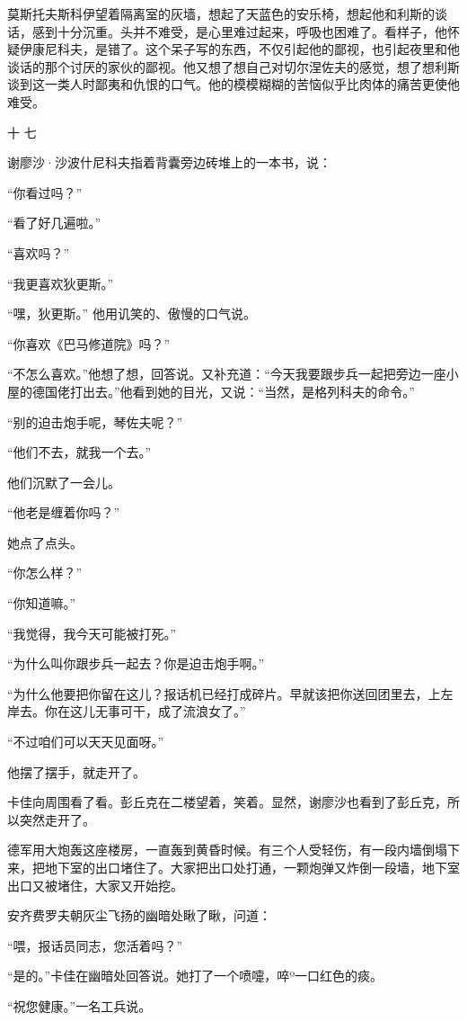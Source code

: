 莫斯托夫斯科伊望着隔离室的灰墙，想起了天蓝色的安乐椅，想起他和利斯的谈话，感到十分沉重。头并不难受，是心里难过起来，呼吸也困难了。看样子，他怀疑伊康尼科夫，是错了。这个呆子写的东西，不仅引起他的鄙视，也引起夜里和他谈话的那个讨厌的家伙的鄙视。他又想了想自己对切尔涅佐夫的感觉，想了想利斯谈到这一类人时鄙夷和仇恨的口气。他的模模糊糊的苦恼似乎比肉体的痛苦更使他难受。

十 七

谢廖沙·沙波什尼科夫指着背囊旁边砖堆上的一本书，说：

“你看过吗？”

“看了好几遍啦。”

“喜欢吗？”

“我更喜欢狄更斯。”

“嘿，狄更斯。” 他用讥笑的、傲慢的口气说。

“你喜欢《巴马修道院》吗？”

“不怎么喜欢。”他想了想，回答说。又补充道：“今天我要跟步兵一起把旁边一座小屋的德国佬打出去。”他看到她的目光，又说：“当然，是格列科夫的命令。”

“别的迫击炮手呢，琴佐夫呢？”

“他们不去，就我一个去。”

他们沉默了一会儿。

“他老是缠着你吗？”

她点了点头。

“你怎么样？”

“你知道嘛。”

“我觉得，我今天可能被打死。”

“为什么叫你跟步兵一起去？你是迫击炮手啊。”

“为什么他要把你留在这儿？报话机已经打成碎片。早就该把你送回团里去，上左岸去。你在这儿无事可干，成了流浪女了。”

“不过咱们可以天天见面呀。”

他摆了摆手，就走开了。

卡佳向周围看了看。彭丘克在二楼望着，笑着。显然，谢廖沙也看到了彭丘克，所以突然走开了。

德军用大炮轰这座楼房，一直轰到黄昏时候。有三个人受轻伤，有一段内墙倒塌下来，把地下室的出口堵住了。大家把出口处打通，一颗炮弹又炸倒一段墙，地下室出口又被堵住，大家又开始挖。

安齐费罗夫朝灰尘飞扬的幽暗处瞅了瞅，问道：

“喂，报话员同志，您活着吗？”

“是的。”卡佳在幽暗处回答说。她打了一个喷嚏，啐º一口红色的痰。

“祝您健康。”一名工兵说。

